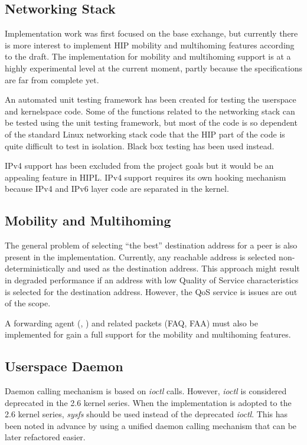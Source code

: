 \subsection{Networking Stack}
\label{sec:networking_stack_future_work}

Implementation work was first focused on the base exchange, but
currently there is more interest to implement HIP mobility and
multihoming features according to the \cite{hip-mm} draft. The
implementation for mobility and multihoming support is at a highly
experimental level at the current moment, partly because the
specifications are far from complete yet.

An automated unit testing framework has been created for testing the
userspace and kernelspace code. Some of the functions related to the
networking stack can be tested using the unit testing framework, but
most of the code is so dependent of the standard Linux networking
stack code that the HIP part of the code is quite difficult to test in
isolation. Black box testing has been used instead.

IPv4 support has been excluded from the project goals but it would be
an appealing feature in HIPL. IPv4 support requires its own hooking
mechanism because IPv4 and IPv6 layer code are separated in the
kernel.

\subsection{Mobility and Multihoming}
\label{sec:future_mobility_and_multihoming}

The general problem of selecting ``the best'' destination address for
a peer is also present in the implementation. Currently, any reachable
address is selected non-deterministically and used as the destination
address. This approach might result in degraded performance if an
address with low Quality of Service characteristics is selected for
the destination address. However, the QoS service is issues are out of
the scope.

A forwarding agent (\cite{hiparch}, \cite{hip-mm}) and related packets
(FAQ, FAA) must also be implemented for gain a full support for the
mobility and multihoming features.

\subsection{Userspace Daemon}
\label{sec:daemon_future_work}

Daemon calling mechanism is based on \textit{ioctl} calls. However,
\textit{ioctl} is considered deprecated in the 2.6 kernel series. When
the implementation is adopted to the 2.6 kernel series, \textit{sysfs}
should be used instead of the deprecated \textit{ioctl}. This has been
noted in advance by using a unified daemon calling mechanism that can
be later refactored easier.


